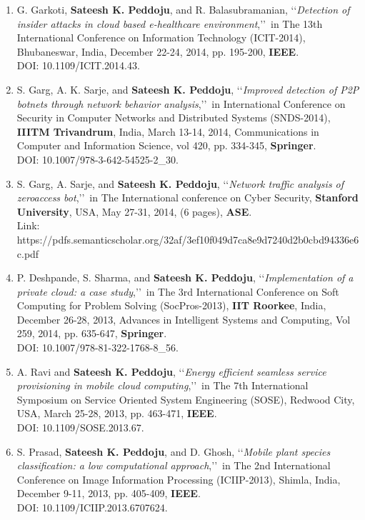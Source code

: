 \begin{enumerate}
	\item
	G. Garkoti, \textbf{Sateesh K. Peddoju}, and R. Balasubramanian, \lq\lq \textit{Detection of insider attacks in cloud based e-healthcare environment},\rq\rq\, in The 13th International Conference on Information Technology (ICIT-2014), Bhubaneswar, India, December 22-24, 2014, pp. 195-200,  \textbf{IEEE}. \\DOI: 10.1109/ICIT.2014.43.
	
	\item
	S. Garg, A. K. Sarje, and \textbf{Sateesh K. Peddoju}, \lq\lq \textit{Improved detection of P2P botnets through network behavior analysis},\rq\rq\, in International Conference on Security in Computer Networks and Distributed Systems (SNDS-2014), \textbf{IIITM Trivandrum}, India, March 13-14, 2014, Communications in Computer and Information Science, vol 420, pp. 334-345, \textbf{Springer}. \\DOI: 10.1007/978-3-642-54525-2\_30.
	
	\item
	S. Garg, A. Sarje, and \textbf{Sateesh K. Peddoju}, \lq\lq \textit{Network traffic analysis of zeroaccess bot},\rq\rq\, in The International conference on Cyber Security, \textbf{Stanford University}, USA, May 27-31, 2014, (6 pages), \textbf{ASE}. \\Link: https://pdfs.semanticscholar.org/32af/3ef10f049d7ca8e9d7240d2b0cbd94336e6c.pdf
	
	\item
	P. Deshpande, S. Sharma, and \textbf{Sateesh K. Peddoju}, \lq\lq \textit{Implementation of a private cloud: a case study},\rq\rq\, in The 3rd International Conference on Soft Computing for Problem Solving (SocPros-2013), \textbf{IIT Roorkee}, India, December 26-28, 2013, Advances in Intelligent Systems and Computing, Vol 259, 2014, pp. 635-647, \textbf{Springer}. \\DOI: 10.1007/978-81-322-1768-8\_56.
	
	\item
	A. Ravi and \textbf{Sateesh K. Peddoju}, \lq\lq \textit{Energy efficient seamless service provisioning in mobile cloud computing},\rq\rq\, in The 7th International Symposium on Service Oriented System Engineering (SOSE), Redwood City, USA, March 25-28, 2013, pp. 463-471, \textbf{IEEE}. \\DOI: 10.1109/SOSE.2013.67.
	
	\item
	S. Prasad, \textbf{Sateesh K. Peddoju}, and D. Ghosh, \lq\lq \textit{Mobile plant species classification: a low computational approach},\rq\rq\, in The 2nd International Conference on Image Information Processing (ICIIP-2013), Shimla, India, December 9-11, 2013, pp. 405-409, \textbf{IEEE}. \\DOI: 10.1109/ICIIP.2013.6707624.
	

\end{enumerate}
